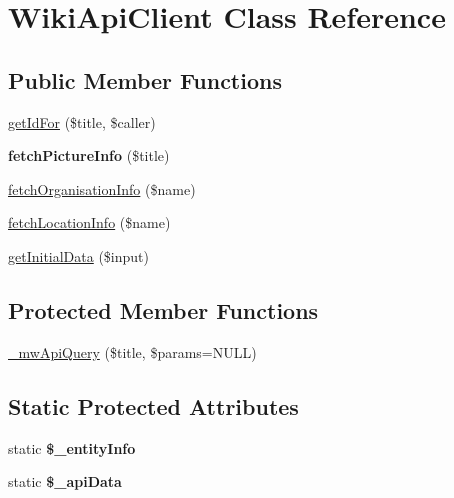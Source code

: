 \hypertarget{classWikiApiClient}{
\section{WikiApiClient Class Reference}
\label{classWikiApiClient}
}
\subsection*{Public Member Functions}
\begin{DoxyCompactItemize}
\item 
\hyperlink{classWikiApiClient_a2c3f86f24548e5582ba34173a15164a9}{getIdFor} (\$title, \$caller)
\item 
\hypertarget{classWikiApiClient_acf09010e0ae78dfeb8db3ffcded2149c}{
{\bfseries fetchPictureInfo} (\$title)}
\label{classWikiApiClient_acf09010e0ae78dfeb8db3ffcded2149c}

\item 
\hyperlink{classWikiApiClient_a9074ac0858ff5c004e89db198eeca12e}{fetchOrganisationInfo} (\$name)
\item 
\hyperlink{classWikiApiClient_a026b0b177e61ec50facee0cbf1f78801}{fetchLocationInfo} (\$name)
\item 
\hyperlink{classWikiApiClient_ad12f674376d55bfbc550ad9172adaa08}{getInitialData} (\$input)
\end{DoxyCompactItemize}
\subsection*{Protected Member Functions}
\begin{DoxyCompactItemize}
\item 
\hyperlink{classWikiApiClient_a4d35fdd2fce968f85e239091ff0f58ff}{\_\-mwApiQuery} (\$title, \$params=NULL)
\end{DoxyCompactItemize}
\subsection*{Static Protected Attributes}
\begin{DoxyCompactItemize}
\item 
\hypertarget{classWikiApiClient_a1d3db9dcf75e6a1a6d5e9853709d4e06}{
static {\bfseries \$\_\-entityInfo}}
\label{classWikiApiClient_a1d3db9dcf75e6a1a6d5e9853709d4e06}

\item 
\hypertarget{classWikiApiClient_a590f2e1156acc1e016c3933b3cc115e8}{
static {\bfseries \$\_\-apiData}}
\label{classWikiApiClient_a590f2e1156acc1e016c3933b3cc115e8}

\end{DoxyCompactItemize}


